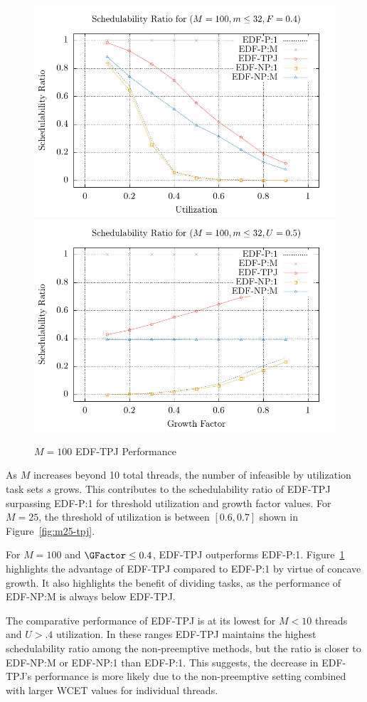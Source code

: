 \begin{figure}[ht]
  \centering
  \includegraphics[width=\cwidth]{plot/2D-UFS/2D-M100m32F0_4xS}\quad
  \includegraphics[width=\cwidth]{plot/2D-UFS/2D-M100m32U0_5xS}%
  \caption{${M = 100}$ EDF-TPJ Performance}
  \label{fig:m100-tpj}
\end{figure}

As ${M}$ increases beyond 10 total threads, the number of infeasible
by utilization task sets ${s}$ grows. This contributes to the
schedulability ratio of EDF-TPJ surpassing EDF-P:1 for
threshold utilization and growth factor values. For ${M = 25}$, the
threshold of utilization is between ${[0.6,0.7]}$ shown in
Figure~\ref{fig:m25-tpj}.

For ${M = 100}$ and ${\GFactor \le 0.4}$, EDF-TPJ outperforms
EDF-P:1. Figure~\ref{fig:m100-tpj} highlights the advantage of
EDF-TPJ compared to EDF-P:1 by virtue of concave growth. It also
highlights the benefit of dividing tasks, as the performance of
EDF-NP:M is always below EDF-TPJ.

The comparative performance of EDF-TPJ is at its lowest
for ${M < 10}$ threads and ${U > .4}$ utilization. In these ranges
EDF-TPJ maintains the highest schedulability ratio among the
non-preemptive methods, but the ratio is closer to EDF-NP:M or
EDF-NP:1 than EDF-P:1. This suggests, the decrease in EDF-TPJ's
performance is more likely due to the non-preemptive setting combined
with larger WCET values for individual threads.
